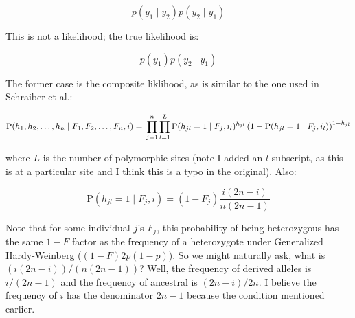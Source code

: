 \documentclass[12pt]{article}\usepackage[]{graphicx}\usepackage[]{color}
\begin{document}
$$ p(y_1 \mid y_2) p(y_2 \mid y_1)$$

This is not a likelihood; the true likelihood is:

$$ p(y_1) p(y_2 \mid y_1) $$

The former case is the composite liklihood, as is similar to the one
used in Schraiber et al.:

\begin{equation} \label{eq:schraiber:06}
\text{P}(h_1, h_2, \ldots, h_n \mid F_1, F_2, \ldots, F_n, i) = \\
\prod_{j=1}^n \prod_{l=1}^L \text{P}(h_{jl} = 1 \mid F_j, i_l)^{h_{jl}} \left( 1 - \text{P}(h_{jl} = 1 \mid F_j, i_l)\right)^{1 - h_{jl}}
\end{equation}

where $L$ is the number of polymorphic sites (note I added an $l$
subscript, as this is at a particular site and I think this is a typo
in the original). Also:

\begin{equation} \label{eq:schraiber:07}
\text{P}(h_{jl} = 1 \mid F_j, i) = (1 - F_j) \frac{i (2n - i)} {n (2n - 1)}
\end{equation}

Note that for some individual $j$'s $F_j$, this probability of being
heterozygous has the same $1 - F$ factor as the frequency of a
heterozygote under Generalized Hardy-Weinberg ($(1-F)2p(1 - p)$). So
we might naturally ask, what is $(i(2n - i))/(n(2n - 1))$? Well, the
frequency of derived alleles is $i/(2n - 1)$ and the frequency of
ancestral is $(2n - i)/2n$. I believe the frequency of $i$ has the
denominator $2n - 1$ because the condition mentioned earlier.




\end{document}
